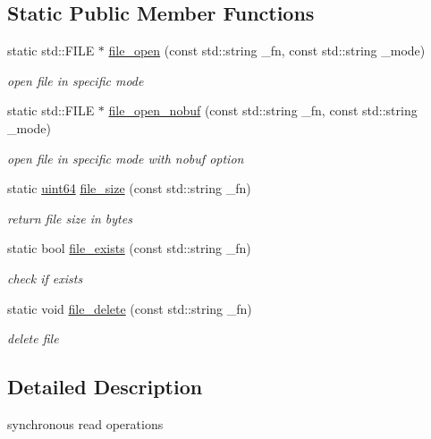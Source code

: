 \subsection*{Static Public Member Functions}
\begin{DoxyCompactItemize}
\item 
static std\+::\+F\+I\+LE $\ast$ \hyperlink{class_basic_i_o_a0a548f83f6d4289239347e8fd2c93a32}{file\+\_\+open} (const std\+::string \+\_\+fn, const std\+::string \+\_\+mode)
\begin{DoxyCompactList}\small\item\em open file in specific mode \end{DoxyCompactList}\item 
static std\+::\+F\+I\+LE $\ast$ \hyperlink{class_basic_i_o_ad4ba62659302987f0bf22d5e4a705ab1}{file\+\_\+open\+\_\+nobuf} (const std\+::string \+\_\+fn, const std\+::string \+\_\+mode)
\begin{DoxyCompactList}\small\item\em open file in specific mode with nobuf option \end{DoxyCompactList}\item 
static \hyperlink{types_8h_a60e8696a4678cd348e991a1f172e53f7}{uint64} \hyperlink{class_basic_i_o_a6cafa2bbf504906e3484bd1c1df10474}{file\+\_\+size} (const std\+::string \+\_\+fn)
\begin{DoxyCompactList}\small\item\em return file size in bytes \end{DoxyCompactList}\item 
static bool \hyperlink{class_basic_i_o_a875c4dd065101a3fe469222699a45708}{file\+\_\+exists} (const std\+::string \+\_\+fn)
\begin{DoxyCompactList}\small\item\em check if exists \end{DoxyCompactList}\item 
static void \hyperlink{class_basic_i_o_ad47c4d4b9845b01ad4ee0e81e726472c}{file\+\_\+delete} (const std\+::string \+\_\+fn)
\begin{DoxyCompactList}\small\item\em delete file \end{DoxyCompactList}\end{DoxyCompactItemize}


\subsection{Detailed Description}
synchronous read operations 

